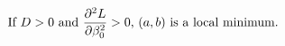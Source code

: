 \documentclass[preview]{standalone}
\begin{document}
\begin{align*}
\special{dvisvgm:raw <g id='unique000'>}\text{If }D>0\text{ and }\frac{\partial^2 L}{\partial \beta_0^2}>0\text{, }(a,b)\text{ is a local minimum}.\special{dvisvgm:raw </g>}
\end{align*}
\end{document}
